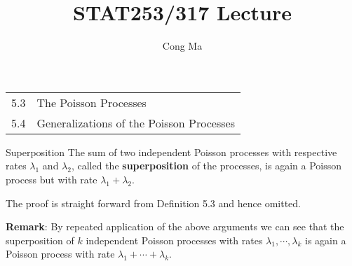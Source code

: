 \documentclass[letterpaper,handout, mathserif]{beamer}
\title{STAT253/317 Lecture \chapnum} \date{} \author{Cong Ma}
\begin{document}
\begin{frame}\maketitle
\begin{center}
\begin{tabular}{ll}
5.3 & The Poisson Processes\\
5.4 & Generalizations of the Poisson Processes
\end{tabular}
\end{center}
\end{frame}
\begin{frame}{Superposition}
The sum of two independent Poisson processes with respective rates $\lambda_1$ and $\lambda_2$, called the {\bf superposition} of the processes, is again a Poisson process but with rate $\lambda_1+\lambda_2$.\par\medskip

The proof is straight forward from Definition 5.3 and hence omitted.\bigskip

{\bf Remark}: By repeated application of the above arguments we can
see that the superposition of $k$ independent Poisson processes with
rates $\lambda_1,\cdots,\lambda_k$ is again a Poisson process with rate $\lambda_1+\cdots+\lambda_k$.
\end{frame}
%
\end{document}
